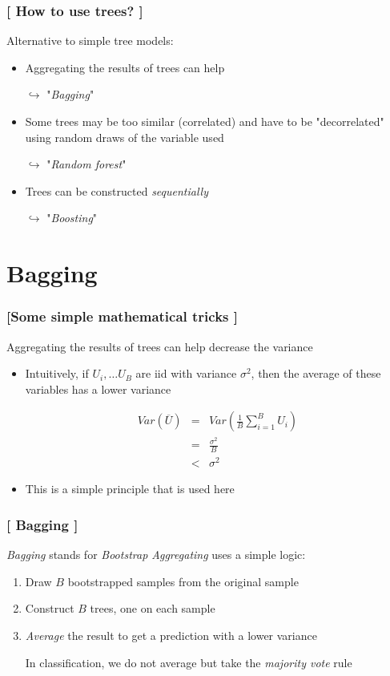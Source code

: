 \documentclass[xcolor=x11names,compress, handhouts]{beamer}
\renewcommand{\(}{\begin{columns}}
\renewcommand{\)}{\end{columns}}
\newcommand{\<}[1]{\begin{column}{#1}}
\renewcommand{\>}{\end{column}}
\begin{document}
\begin{frame}
\frametitle{\textcolor{brique}{[ How to use trees? ]}}
Alternative to simple tree models:
\pause
\begin{itemize}[<+->]
    \item Aggregating the results of trees can help
    \item[$\hookrightarrow$]  "\emph{Bagging}"
    \item Some trees may be too similar (correlated) and have to be "decorrelated" using random draws of the variable used
    \item[$\hookrightarrow$]  "\emph{Random forest}"
    \item Trees can be constructed \textit{sequentially}
    \item[$\hookrightarrow$] "\emph{Boosting}"
\end{itemize}
\end{frame}



\section{Bagging}

\begin{frame}
\frametitle{\textcolor{brique}{[Some simple mathematical tricks ]}}
Aggregating the results of trees can help decrease the variance %
\pause
\begin{itemize}[<+->]
    \item  Intuitively, if $U_{i}, \ldots U_{B}$ are  iid with variance $\sigma^{2}$, then the average of these variables has a lower variance
    \item[]
\begin{eqnarray*}
Var ( \overline{U}) &=&  Var \left( \frac{1}{B} \sum_{i=1}^{B} U_i \right) \\
            &=&  \frac{\sigma^{2}}{B} \\
            & < & \sigma^{2}
\end{eqnarray*}
    \item This is a simple principle that is used here
\end{itemize}
\end{frame}

\begin{frame}
\frametitle{\textcolor{brique}{[ Bagging ]}}
\textit{Bagging} stands for \textit{Bootstrap Aggregating} uses a simple logic:
\pause
\begin{enumerate}[<+->]
    \item Draw $B$ bootstrapped samples from the original sample
    \item Construct $B$ trees, one on each sample
    \item  \textit{Average} the result to get a prediction  with a lower variance
    \item[]
    \item[]In classification, we do not average but take the \emph{majority vote} rule
\end{enumerate}
\end{frame}
\end{document}

